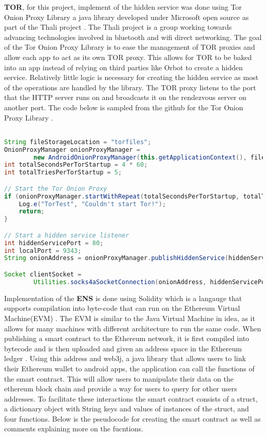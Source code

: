 \documentclass[../main/main.tex]{subfiles}
\begin{document}
\textbf{TOR}, for this project, implement of the hidden service was done using Tor Onion Proxy Library a java library \cite{THALIGIT} developed under Microsoft open source as part of the Thali project \cite{THALI}. 
The Thali project is a group working towards advancing technologies involved in bluetooth and wifi direct networking.
The goal of the Tor Onion Proxy Library is to ease the management of TOR proxies and allow each app to act as its own TOR proxy. 
This allows for TOR to be baked into an app instead of relying on third parties like Orbot to create a hidden service. 
Relatively little logic is necessary for creating the hidden service as most of the operations are handled by the library. 
The TOR proxy listens to the port that the HTTP server runs on and broadcasts it on the rendezvous server on another port.
The code below is sampled from the github for the Tor Onion Proxy Library \cite{THALIGIT}.

\begin{lstlisting}[caption={Psuedocode for hidden service.}, label={lst:example5}, language=Java]

String fileStorageLocation = "torfiles";
OnionProxyManager onionProxyManager =
        new AndroidOnionProxyManager(this.getApplicationContext(), fileStorageLocation);
int totalSecondsPerTorStartup = 4 * 60;
int totalTriesPerTorStartup = 5;

// Start the Tor Onion Proxy
if (onionProxyManager.startWithRepeat(totalSecondsPerTorStartup, totalTriesPerTorStartup, true) == false) {
    Log.e("TorTest", "Couldn't start Tor!");
    return;
}

// Start a hidden service listener
int hiddenServicePort = 80;
int localPort = 9343;
String onionAddress = onionProxyManager.publishHiddenService(hiddenServicePort, localPort);

Socket clientSocket =
        Utilities.socks4aSocketConnection(onionAddress, hiddenServicePort, "127.0.0.1", localPort);


\end{lstlisting}


Implementation of the \textbf{ENS} is done using Solidity which is a langauge that supports compilation into byte-code that can run on the Ethereum Virtual Machine(EVM) \cite{ETH}. 
The EVM is similar to the Java Virtual Machine in idea, as it allows for many machines with different architecture to run the same code. 
When publishing a smart contract to the Ethereum network, it is first compiled into bytecode and is then uploaded and given an address space in the Ethereum ledger \cite{ETH}. 
Using this address and web3j, a java library that allows users to link their Ethereum wallet to android apps, the application can call the functions of the smart contract. 
This will allow users to manipulate their data on the ethereum block chain and provide a way for users to query for other users addresses. 
To facilitate these interactions the smart contract consists of a struct, a dictionary object with String keys and values of instances of the struct, and four functions. 
Below is the pseudocode for creating the smart contract as well as comments explaining more on the fucntions. 
\end{document}
